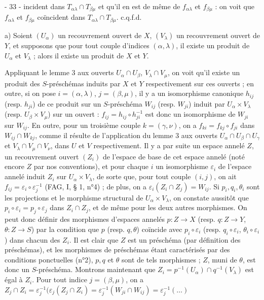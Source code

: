 \newpage


- 33 -
incident dans $T_{\alpha\lambda} \cap T_{\beta\mu}$ et qu'il en est de même de $f_{\alpha\lambda}$ et $f_{\beta\mu}$ : on voit que $f_{\alpha\lambda}$ et $f_{\beta\mu}$ coïncident dans $T_{\alpha\lambda} \cap T_{\beta\mu}$. c.q.f.d.

a) Soient $(U_\alpha)$ un recouvrement ouvert de $X$, $(V_\lambda)$ un recouvrement ouvert de $Y$, et supposons que pour tout couple d'indices $(\alpha,\lambda)$, il existe un produit de $U_\alpha$ et $V_\lambda$ ; alors il existe un produit de $X$ et $Y$.

Appliquant le lemme 3 aux ouverts $U_\alpha \cap U_\beta$, $V_\lambda \cap V_\mu$, on voit qu'il existe un produit des $S$-préschémas induits par $X$ et $Y$ respectivement sur ces ouverts ; en outre, si on pose $i=(\alpha,\lambda)$, $j=(\beta,\mu)$, il y a un isomorphisme canonique $h_{ij}$ (resp. $h_{ji}$) de ce produit sur un $S$-préschéma $W_{ij}$ (resp. $W_{ji}$) induit par $U_\alpha \times V_\lambda$ (resp. $U_\beta \times V_\mu$) sur un ouvert : $f_{ij} = h_{ij} \circ h_{ji}^{-1}$ est donc un isomorphisme de $W_{ji}$ sur $W_{ij}$. En outre, pour un troisième couple $k=(\gamma,\nu)$, on a $f_{ki} = f_{kj} \circ f_{ji}$ dans $W_{ij} \cap W_{kj}$, comme il résulte de l'application du lemme 3 aux ouverts $U_\alpha \cap U_\beta \cap U_\gamma$ et $V_\lambda \cap V_\mu \cap V_\nu$, dans $U$ et $V$ respectivement. Il y a par suite un espace annelé $Z$, un recouvrement ouvert $(Z_i)$ de l'espace de base de cet espace annelé (noté encore $Z$ par nos conventions), et pour chaque $i$ un isomorphisme $\varepsilon_i$ de l'espace annelé induit $Z_i$ sur $U_\alpha \times V_\lambda$, de sorte que, pour tout couple $(i,j)$, on ait $f_{ij} = \varepsilon_i \circ \varepsilon_j^{-1}$ (FAG, I, § 1, n°4) ; de plus, on a $\varepsilon_i(Z_i \cap Z_j) = W_{ij}$. Si $p_i, q_i, \theta_i$ sont les projections et le morphisme structural de $U_\alpha \times V_\lambda$, on constate aussitôt que $p_i \circ \varepsilon_i = p_j \circ \varepsilon_j$ dans $Z_i \cap Z_j$, et de même pour les deux autres morphismes. On peut donc définir des morphismes d'espaces annelés $p: Z \to X$ (resp. $q: Z \to Y$, $\theta: Z \to S$) par la condition que $p$ (resp. $q, \theta$) coïncide avec $p_i \circ \varepsilon_i$ (resp. $q_i \circ \varepsilon_i$, $\theta_i \circ \varepsilon_i$) dans chacun des $Z_i$. Il est clair que $Z$ est un préschéma (par définition des préschémas), et les morphismes de préschémas étant caractérisés par des conditions ponctuelles (n°2), $p, q$ et $\theta$ sont de tels morphismes ; $Z$, muni de $\theta$, est donc un $S$-préschéma. Montrons maintenant que $Z_i = p^{-1}(U_\alpha) \cap q^{-1}(V_\lambda)$ est égal à $Z_i$. Pour tout indice $j=(\beta,\mu)$, on a $Z_j \cap Z_i = \varepsilon_j^{-1}(\varepsilon_j(Z_j \cap Z_i) = \varepsilon_j^{-1}(W_{ji} \cap W_{ij}) = \varepsilon_j^{-1}(\dots)$

